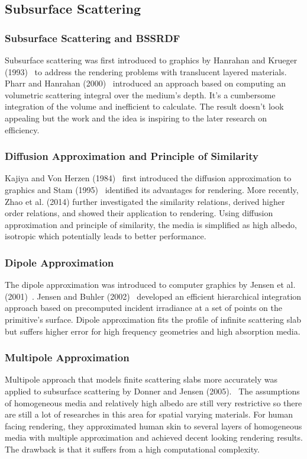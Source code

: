 \documentclass[letterpaper,12pt]{article}
\begin{document}
\subsection{Subsurface Scattering}
\subsubsection{Subsurface Scattering and BSSRDF}
Subsurface scattering was first introduced to graphics by Hanrahan and Krueger (1993)~\cite{hanrahan1993reflection} to address the rendering problems with translucent layered materials. Pharr and Hanrahan (2000)~\cite{pharr2000monte} introduced an approach based on computing an volumetric scattering integral over the medium’s depth. It's a cumbersome integration of the volume and inefficient to calculate. The result doesn't look appealing but the work and the idea is inspiring to the later research on efficiency.

\subsubsection{Diffusion Approximation and Principle of Similarity}
Kajiya and Von Herzen (1984)~\cite{kajiya1984ray} first introduced the diffusion approximation to graphics and Stam (1995)~\cite{stam1995multiple} identified its advantages for rendering. More recently, Zhao et al. (2014)\cite{zhao2014high} further investigated the similarity relations, derived higher order relations, and showed their application to rendering. Using diffusion approximation and principle of similarity, the media is simplified as high albedo, isotropic which potentially leads to better performance.

\subsubsection{Dipole Approximation}
The dipole approximation was introduced to computer graphics by Jensen et al. (2001)~\cite{jensen2001practical}. Jensen and Buhler (2002)~\cite{jensen2005rapid} developed an efficient hierarchical integration approach based on precomputed incident irradiance at a set of points on the primitive’s surface. Dipole approximation fits the profile of infinite scattering slab but suffers higher error for high frequency geometries and high absorption media.

\subsubsection{Multipole Approximation}
Multipole approach that models finite scattering slabs more accurately was applied to subsurface scattering by Donner and Jensen (2005).~\cite{donner2005light} The assumptions of homogeneous media and relatively high albedo are still very restrictive so there are still a lot of researches in this area for spatial varying materials. For human facing rendering, they approximated human skin to several layers of homogeneous media with multiple approximation and achieved decent looking rendering results. The drawback is that it suffers from a high computational complexity.
\end{document}

